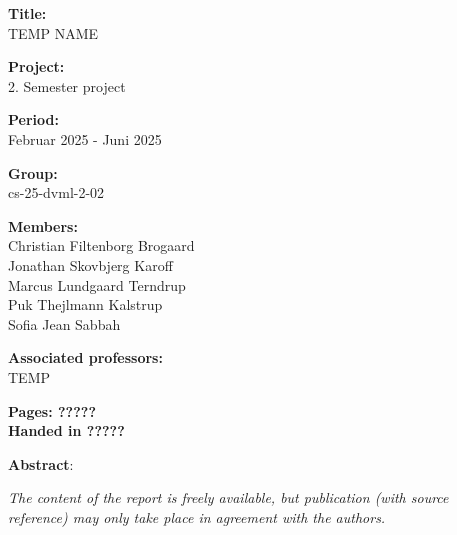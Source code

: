 \begin{minipage}[t]{0.48\textwidth}
\textbf{Title:} \\[5pt]\hspace*{2ex}
TEMP NAME

\vspace*{2ex}

\textbf{Project:} \\[5pt]\bigskip\hspace{2ex}
2. Semester project

\textbf{Period:} \\[5pt]\bigskip\hspace{2ex}
Februar 2025 -  Juni 2025

\textbf{Group:} \\[5pt]\bigskip\hspace{2ex}
cs-25-dvml-2-02

\textbf{Members:} \\[5pt]\hspace*{2ex}
Christian Filtenborg Brogaard \\\hspace*{2ex}
Jonathan Skovbjerg Karoff \\\hspace*{2ex}
Marcus Lundgaard Terndrup \\\hspace*{2ex}
Puk Thejlmann Kalstrup \\\hspace*{2ex}
Sofia Jean Sabbah \\\hspace*{2ex}


\textbf{Associated professors:} \\[5pt]\hspace*{2ex}
TEMP
\\\hspace*{2ex}

\vspace*{1cm}

\textbf{Pages: ?????} \\
\textbf{Handed in ?????}

\end{minipage}
\hfill
\begin{minipage}[t]{0.5\textwidth}
\textbf{Abstract}: \\[5pt]
\fbox{\parbox{8cm}{}}
\end{minipage}

\vfill

{\footnotesize\itshape \noindent The content of the report is freely available, but publication (with source reference) may only take place in agreement with the authors.}

